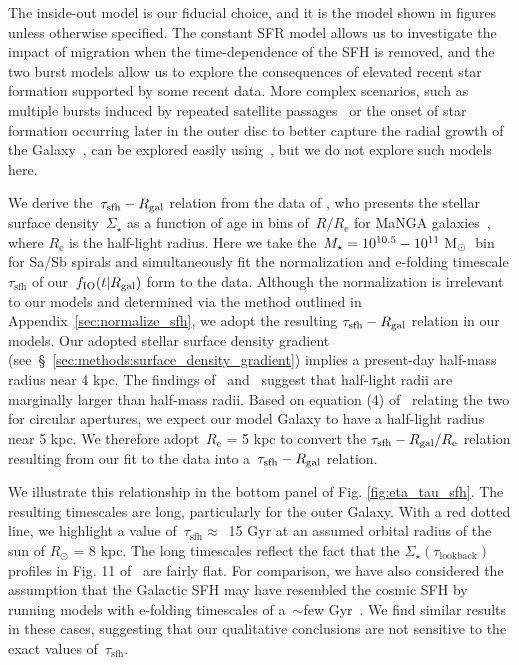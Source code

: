 \documentclass[draft2.tex]{subfiles}
\begin{document}
The inside-out model is our fiducial choice, and it is the model shown in 
figures unless otherwise specified. 
The constant SFR model allows us to investigate the impact of migration when 
the time-dependence of the SFH is removed, and the two burst models allow us to 
explore the consequences of elevated recent star formation supported by some 
recent data. 
More complex scenarios, such as multiple bursts induced by repeated satellite 
passages~\citep[e.g.][]{Lian2020a, Lian2020b, RuizLara2020, Sysoliatina2021} or 
the onset of star formation occurring later in the outer disc to better capture 
the radial growth of the Galaxy~\citep[e.g.][]{Frankel2019}, can be 
explored easily using~\vice, but we do not explore such models here. 
\par 
We derive the~$\tau_\text{sfh}-R_\text{gal}$ relation from the data of 
\citet{Sanchez2020}, who presents the stellar surface density~$\Sigma_\star$ as 
a function of age in bins of~$R/R_\text{e}$ for MaNGA 
galaxies~\citep{Bundy2015}, where $R_\text{e}$ is the half-light radius. 
Here we take the~$M_\star = 10^{10.5} - 10^{11}~\text{M}_\odot$~bin for Sa/Sb spirals 
and simultaneously fit the normalization and e-folding timescale 
$\tau_\text{sfh}$ of our~$f_\text{IO}(t|R_\text{gal})$ form to the data. 
Although the normalization is irrelevant to our models and determined via the 
method outlined in Appendix~\ref{sec:normalize_sfh}, we adopt the resulting 
$\tau_\text{sfh}-R_\text{gal}$ relation in our models. 
Our adopted stellar surface density gradient 
(see~\S~\ref{sec:methods:surface_density_gradient}) implies a present-day 
half-mass radius near 4 kpc. 
The findings of~\citet{Garcia-Benito2017} and~\citet{GonzalezDelgado2014} 
suggest that half-light radii are marginally larger than half-mass radii. 
Based on equation (4) of~\citet{GonzalezDelgado2014} relating the two for 
circular apertures, we expect our model Galaxy to have a 
half-light radius near 5 kpc. 
We therefore adopt~$R_\text{e}$ = 5 kpc to convert the 
$\tau_\text{sfh}-R_\text{gal}/R_\text{e}$ relation resulting from our fit to the 
\citet{Sanchez2020} data into a~$\tau_\text{sfh}-R_\text{gal}$ relation. 
\par 
We illustrate this relationship in the bottom panel of Fig. 
\ref{fig:eta_tau_sfh}. 
The resulting timescales are long, particularly for the outer Galaxy. 
With a red dotted line, we highlight a value of~$\tau_\text{sfh} \approx$~15 
Gyr at an assumed orbital radius of the sun of $R_\odot$ = 8 kpc. 
The long timescales reflect the fact that the 
$\Sigma_\star(\tau_\text{lookback})$ profiles in Fig. 11 of~\citet{Sanchez2020} 
are fairly flat. 
For comparison, we have also considered the assumption that the Galactic SFH 
may have resembled the cosmic SFH by running models with e-folding timescales 
of a~$\sim$few Gyr~\citep[e.g.][]{Madau2014}. 
We find similar results in these cases, suggesting that our qualitative 
conclusions are not sensitive to the exact values of~$\tau_\text{sfh}$. 
\end{document}
